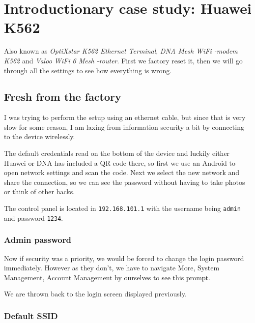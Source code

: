 \documentclass[../wifi-security.tex]{subfiles}
\begin{document}
\chapter{Introductionary case study: Huawei K562}

Also known as \textit{OptiXstar K562 Ethernet Terminal}, \textit{DNA Mesh WiFi -modem K562} and \textit{Valoo WiFi 6 Mesh -router}. First we factory reset it, then we will go through all the settings to see how everything is wrong.

\section{Fresh from the factory}

I was trying to perform the setup using an ethernet cable, but since that is very slow for some reason, I am laxing from information security a bit by connecting to the device wirelessly.


The default credentials read on the bottom of the device and luckily either Huawei or DNA has included a QR code there, so first we use an Android to open network settings and scan the code. Next we select the new network and share the connection, so we can see the password without having to take photos or think of other hacks.

The control panel is located in \texttt{192.168.101.1} with the username being \texttt{admin} and password \texttt{1234}.


\subsection{Admin password}

Now if security was a priority, we would be forced to change the login password immediately. However as they don't, we have to navigate More, System Management, Account Management by ourselves to see this prompt.


We are thrown back to the login screen displayed previously.


\subsection{Default SSID}
\end{document}
